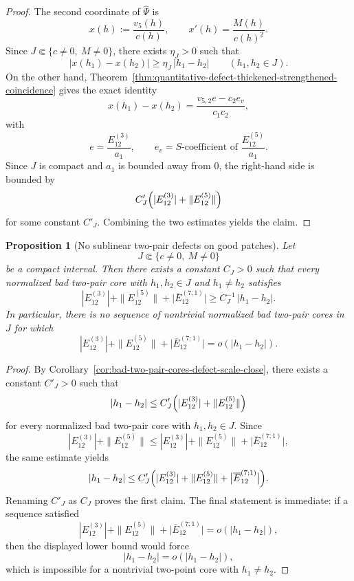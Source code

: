 \documentclass[11pt,a4paper]{amsart}
\theoremstyle{plain}
\newtheorem{proposition}[theorem]{Proposition}
\theoremstyle{definition}
\begin{document}
\begin{proof}
The second coordinate of $\widehat\Psi$ is
\[
x(h):=\frac{v_5(h)}{c(h)},
\qquad
x'(h)=\frac{M(h)}{c(h)^2}.
\]
Since $J\Subset\{c\neq 0,\ M\neq 0\}$, there exists $\eta_J>0$ such that
\[
|x(h_1)-x(h_2)|\ge \eta_J\,|h_1-h_2|
\qquad
(h_1,h_2\in J).
\]
On the other hand, Theorem~\ref{thm:quantitative-defect-thickened-strengthened-coincidence}
gives the exact identity
\[
x(h_1)-x(h_2)
=
\frac{v_{5,2}e-c_2e_v}{c_1c_2},
\]
with
\[
e=\frac{E_{12}^{(3)}}{a_1},
\qquad
e_v=\text{$S$-coefficient of } \frac{E_{12}^{(5)}}{a_1}.
\]
Since $J$ is compact and $a_1$ is bounded away from $0$, the right-hand
side is bounded by
\[
C'_J\Bigl(|E_{12}^{(3)}|+\|E_{12}^{(5)}\|\Bigr)
\]
for some constant $C'_J$. Combining the two estimates yields the claim.
\end{proof}

\begin{proposition}[No sublinear two-pair defects on good patches]
\label{prop:no-sublinear-two-pair-defects-good-patch}
Let
\[
J\Subset\{c\neq 0,\ M\neq 0\}
\]
be a compact interval. Then there exists a constant $C_J>0$ such that every
normalized bad two-pair core with $h_1,h_2\in J$ and $h_1\neq h_2$
satisfies
\[
|E_{12}^{(3)}|+\|E_{12}^{(5)}\|+\bigl|\overline E_{12}^{(7;1)}\bigr|
\ge
C_J^{-1}\,|h_1-h_2|.
\]
In particular, there is no sequence of nontrivial normalized bad two-pair
cores in $J$ for which
\[
|E_{12}^{(3)}|+\|E_{12}^{(5)}\|+\bigl|\overline E_{12}^{(7;1)}\bigr|
=
o\!\left(|h_1-h_2|\right).
\]
\end{proposition}

\begin{proof}
By Corollary~\ref{cor:bad-two-pair-cores-defect-scale-close}, there exists a
constant $C'_J>0$ such that
\[
|h_1-h_2|
\le
C'_J\Bigl(|E_{12}^{(3)}|+\|E_{12}^{(5)}\|\Bigr)
\]
for every normalized bad two-pair core with $h_1,h_2\in J$. Since
\[
|E_{12}^{(3)}|+\|E_{12}^{(5)}\|
\le
|E_{12}^{(3)}|+\|E_{12}^{(5)}\|+\bigl|\overline E_{12}^{(7;1)}\bigr|,
\]
the same estimate yields
\[
|h_1-h_2|
\le
C'_J\Bigl(
|E_{12}^{(3)}|+\|E_{12}^{(5)}\|+\bigl|\overline E_{12}^{(7;1)}\bigr|
\Bigr).
\]
Renaming $C'_J$ as $C_J$ proves the first claim. The final statement is
immediate: if a sequence satisfied
\[
|E_{12}^{(3)}|+\|E_{12}^{(5)}\|+\bigl|\overline E_{12}^{(7;1)}\bigr|
=
o\!\left(|h_1-h_2|\right),
\]
then the displayed lower bound would force
\[
|h_1-h_2|=o\!\left(|h_1-h_2|\right),
\]
which is impossible for a nontrivial two-point core with $h_1\neq h_2$.
\end{proof}
\end{document}
